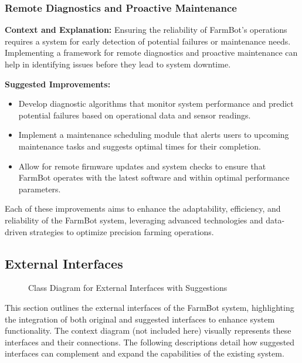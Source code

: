 \subsubsection{Remote Diagnostics and Proactive Maintenance}
\textbf{Context and Explanation:} Ensuring the reliability of FarmBot's operations requires a system for early detection of potential failures or maintenance needs. Implementing a framework for remote diagnostics and proactive maintenance can help in identifying issues before they lead to system downtime.

\textbf{Suggested Improvements:}
\begin{itemize}
    \item Develop diagnostic algorithms that monitor system performance and predict potential failures based on operational data and sensor readings.
    \item Implement a maintenance scheduling module that alerts users to upcoming maintenance tasks and suggests optimal times for their completion.
    \item Allow for remote firmware updates and system checks to ensure that FarmBot operates with the latest software and within optimal performance parameters.
\end{itemize}

Each of these improvements aims to enhance the adaptability, efficiency, and reliability of the FarmBot system, leveraging advanced technologies and data-driven strategies to optimize precision farming operations.


\subsection{External Interfaces}

\begin{figure}[H]
    \centering

\caption{Class Diagram for External Interfaces with Suggestions}
\end{figure}


This section outlines the external interfaces of the FarmBot system, highlighting the integration of both original and suggested interfaces to enhance system functionality. The context diagram (not included here) visually represents these interfaces and their connections. The following descriptions detail how suggested interfaces can complement and expand the capabilities of the existing system.

